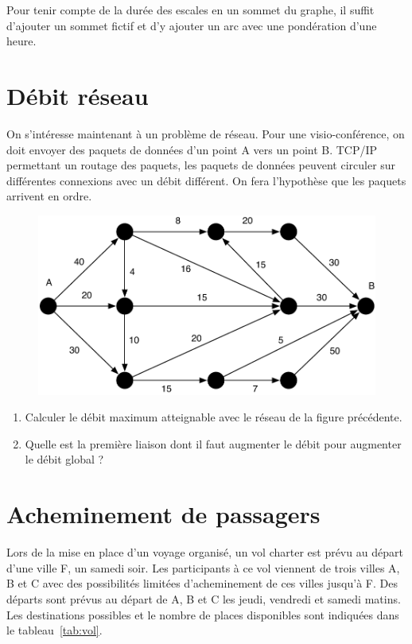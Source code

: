 \documentclass[paper=a4, fontsize=11pt]{scrartcl} %
\numberwithin{equation}{section} %
\numberwithin{figure}{section} %
\numberwithin{table}{section} %
\begin{document}
Pour tenir compte de la durée des escales en un sommet du graphe, il suffit d'ajouter un sommet fictif et d'y ajouter un arc avec une pondération d'une heure. 

\section{Débit réseau}

On s'intéresse maintenant à un problème de réseau. Pour une visio-conférence, on doit envoyer des paquets de données d'un point A vers un point B. TCP/IP permettant un routage des paquets, les paquets de données peuvent circuler sur différentes connexions avec un débit différent. On fera l'hypothèse que les paquets arrivent en ordre. 

\begin{figure}[htbp]
\begin{center}
	\includegraphics[width=.8\textwidth]{graphe1.pdf}
\end{center}
\end{figure}

\begin{enumerate}
\item Calculer le débit maximum atteignable avec le réseau de la figure précédente.
\item Quelle est la première liaison dont il faut augmenter le débit pour augmenter le débit global ?
\end{enumerate}
\section{Acheminement de passagers}

Lors de la mise en place d'un voyage organisé, un vol charter est
prévu au départ d'une ville F, un samedi soir. Les participants à ce
vol viennent de trois villes A, B et C avec des possibilités limitées
d'acheminement de ces villes jusqu'à F. Des départs sont prévus au
départ de A, B et C les jeudi, vendredi et samedi matins. Les
destinations possibles et le nombre de places disponibles sont
indiquées dans le tableau~\ref{tab:vol}.
\end{document}
